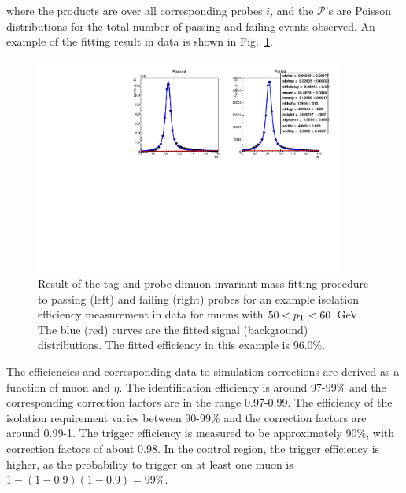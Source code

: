 where the products are over all corresponding probes $i$, and the 
$\mathcal{P}$'s are Poisson distributions for the total number of passing and 
failing events observed.
An example of the fitting result in data is shown in Fig.~\ref{fig:tnp}.

\begin{figure}[h]
\includegraphics[width=0.9\textwidth]{figs/analysis/muonIsolationTight_mll_all_muonDefaultPtBins_pt50-60_Data}
\caption{Result of the tag-and-probe dimuon invariant mass fitting procedure to 
passing (left) and failing (right) probes for an example isolation efficiency 
measurement in data for muons with $50<{p_{\text T}}<60$~GeV. The blue (red) curves are 
the fitted signal (background) distributions. The fitted efficiency in this 
example is 96.0\%.}
\label{fig:tnp}
\end{figure}

The efficiencies and corresponding data-to-simulation corrections are derived 
as a function of muon \pt and $\eta$. The identification efficiency is around 
97-99\% and the corresponding correction factors are in the range 0.97-0.99. 
The efficiency 
of the isolation requirement varies between 90-99\% and the correction factors 
are around 0.99-1. The trigger efficiency is measured to be approximately 90\%, 
with correction factors of about 0.98. 
In the \mmj control region, the trigger efficiency is higher, as the 
probability to trigger on at least one muon is $1-(1-0.9)(1-0.9) = 
99\%$.

